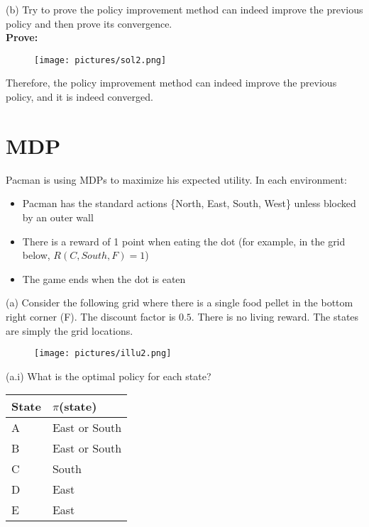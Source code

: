 \documentclass{article}
\begin{document}
\noindent (b) Try to prove the policy improvement method can indeed improve the previous policy and then prove its convergence.\\

\textbf{Prove:} 

\begin{figure}[h]
\centering
\texttt{[image: pictures/sol2.png]}
\end{figure}

Therefore, the policy improvement method can indeed improve the previous policy, and it is indeed converged.

\newpage

\section{MDP}
\noindent Pacman is using MDPs to maximize his expected utility. In each environment:
\begin{itemize}
  \item Pacman has the standard actions \{North, East, South, West\} unless blocked by an outer wall
  \item There is a reward of 1 point when eating the dot (for example, in the grid below, $R(C, South, F ) = 1$)
  \item The game ends when the dot is eaten
\end{itemize}

\noindent (a) Consider the following grid where there is a single food pellet in the bottom right corner (F). The discount factor is $0.5$. There is no living reward. The states are simply the grid locations.

\begin{figure}[h]
\centering
\texttt{[image: pictures/illu2.png]}
\end{figure}

\noindent (a.i) What is the optimal policy for each state?

\renewcommand\arraystretch{1.5}
\begin{table}[tbh!]
\begin{center}
    \begin{tabular}{|p{2cm}| p{2cm}|}
\hline 
 State & $\pi$(state) \\
\hline
A & East or South  \\
\hline
B & East or South  \\
\hline 
C & South  \\
\hline
D & East  \\
\hline
E & East  \\
\hline 
\end{tabular}
\end{center}
\end{table}
\end{document}

